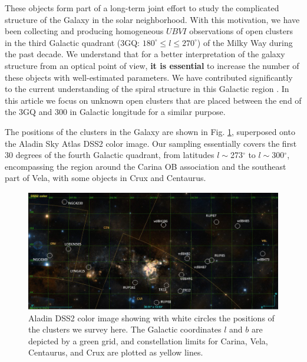 \documentclass[draft]{aa}
\begin{document}
These objects form part of a long-term joint effort to study the
complicated structure of the Galaxy in the solar neighborhood. With this
motivation, we have been collecting and producing
homogeneous $UBVI$ observations of open clusters in the third Galactic quadrant
(3GQ: $180^\circ\leq l \leq270^\circ$) of the Milky Way during the past decade.
We understand that for a better interpretation of the galaxy structure from an
optical point of view, \textbf{it is essential} to increase the number of these  objects
with well-estimated parameters. We have contributed significantly to the
current understanding of the spiral structure in this Galactic region
\citep{Carraro_2005,Moitinho_2006,Vazquez2008,Carraro_2010}.
In this article we focus on unknown open clusters that are placed
between the end of the 3GQ and 300 in Galactic longitude for a similar
purpose.

The positions of the clusters in the Galaxy are shown in Fig. \ref{fig1}, superposed
onto the Aladin Sky Atlas DSS2 color image. Our sampling essentially covers the
first 30 degrees of the fourth Galactic quadrant, from latitudes
$l\sim$273$^\circ$ to $l\sim$300$^\circ$, encompassing the region around the
Carina OB association and the southeast part of Vela, with some objects in Crux
and Centaurus.


\begin{figure}[ht]
    \centering
    \includegraphics[width=\hsize]{../figs/DSS2color.png}
    \caption{Aladin DSS2 color image showing with white circles the positions of
    the clusters we survey here. The Galactic coordinates $l$
    and $b$ are depicted by a green grid, and constellation limits for Carina,
    Vela, Centaurus, and Crux are plotted as yellow lines.}
    \label{fig1}
\end{figure}




\end{document}
